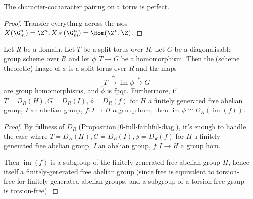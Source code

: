 \begin{proposition}
  \label{0-char-cochar-pairing-perfect}
  \leanok

  The character-cocharacter pairing on a torus is perfect.
\end{proposition}
\begin{proof}
  \leanok

  Transfer everything across the isos $X(\G_m^n) = \Z^n, X*(\G_m^n) = \Hom(\Z^n, \Z)$.
\end{proof}


\begin{proposition}
  \label{1-1-1-group-hom-torus} %

  Let $R$ be a domain. Let $T$ be a split torus over $R$.
  Let $G$ be a diagonalisable group scheme over $R$ and let $\phi: T \to G$ be a homomorphism.
  Then the (scheme theoretic) image of $\phi$ is a split torus over $R$ and the maps
  \[
    T \xrightarrow{\hat{\phi}} \operatorname{im}\phi \xrightarrow{\iota} G
  \]
  are group homomorphisms, and $\hat{\phi}$ is fpqc.
  Furthermore, if $T = D_R(H), G = D_R(I), \phi = D_R(f)$
  for $H$ a finitely generated free abelian group, $I$ an abelian group, $f : I \to H$ a group hom,
  then $\operatorname{im} \phi \cong D_R(\operatorname{im}(f))$.
\end{proposition}
\begin{proof}

  By fullness of $D_R$ (Proposition \ref{0-full-faithful-diag}),
  it's enough to handle the case where $T = D_R(H), G = D_R(I), \phi = D_R(f)$
  for $H$ a finitely generated free abelian group, $I$ an abelian group, $f : I \to H$ a group hom.

  Then $\operatorname{im}(f)$ is a subgroup of the finitely-generated free abelian group $H$,
  hence itself a finitely-generated free abelian group
  (since free is equivalent to torsion-free for finitely-generated abelian groups,
  and a subgroup of a torsion-free group is torsion-free).
\end{proof}


